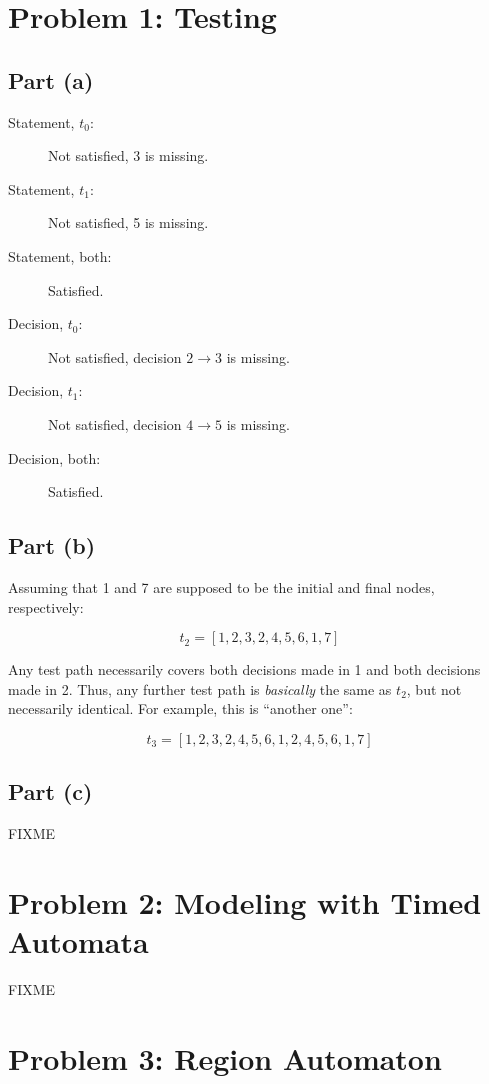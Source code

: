 \documentclass[a4paper,parskip,headheight=38pt]{scrartcl} %
\begin{document}
\section*{Problem 1: Testing}

\subsection*{Part (a)}

\begin{description}
    \item[Statement, $t_0$:] Not satisfied, 3 is missing.
    \item[Statement, $t_1$:] Not satisfied, 5 is missing.
    \item[Statement, both:] Satisfied.
    \item[Decision, $t_0$:] Not satisfied, decision $2 \rightarrow 3$ is missing.
    \item[Decision, $t_1$:] Not satisfied, decision $4 \rightarrow 5$ is missing.
    \item[Decision, both:] Satisfied.
\end{description}

\subsection*{Part (b)}

Assuming that 1 and 7 are supposed to be the initial and final nodes, respectively:

\[ t_2 = [1, 2, 3, 2, 4, 5, 6, 1, 7] \]

Any test path necessarily covers both decisions made in 1 and both
decisions made in 2.  Thus, any further test path is \emph{basically}
the same as $t_2$, but not necessarily identical.  For example, this is
\enquote{another one}:

\[ t_3 = [1, 2, 3, 2, 4, 5, 6, 1, 2, 4, 5, 6, 1, 7] \]

\subsection*{Part (c)}

FIXME


\section*{Problem 2: Modeling with Timed Automata}

FIXME


\section*{Problem 3: Region Automaton}
\end{document}
